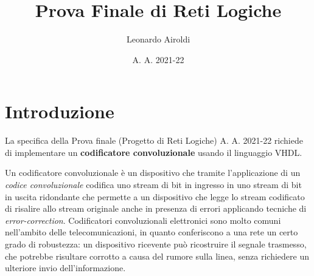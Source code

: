 \documentclass[a4paper]{report}
\title{Prova Finale di Reti Logiche} %
\author{Leonardo Airoldi} %
\date{A. A. 2021-22}
\begin{document}
\maketitle %


\tableofcontents
\newpage





\chapter{Introduzione}


La specifica della Prova finale (Progetto di Reti Logiche) A. A. 2021-22 richiede di implementare un \textbf{codificatore convoluzionale} usando il linguaggio VHDL.

Un codificatore convoluzionale è un dispositivo che tramite l'applicazione di un \textit{codice convoluzionale} codifica uno stream di bit in ingresso in uno stream di bit in uscita ridondante che permette a un dispositivo che legge lo stream codificato di risalire allo stream originale anche in presenza di errori applicando tecniche di \textit{error-correction}.
Codificatori convoluzionali elettronici sono molto comuni nell'ambito delle telecomunicazioni, in quanto conferiscono a una rete un certo grado di robustezza: un dispositivo ricevente può ricostruire il segnale trasmesso, che potrebbe risultare corrotto a causa del rumore sulla linea, senza richiedere un ulteriore invio dell'informazione.
\end{document}
